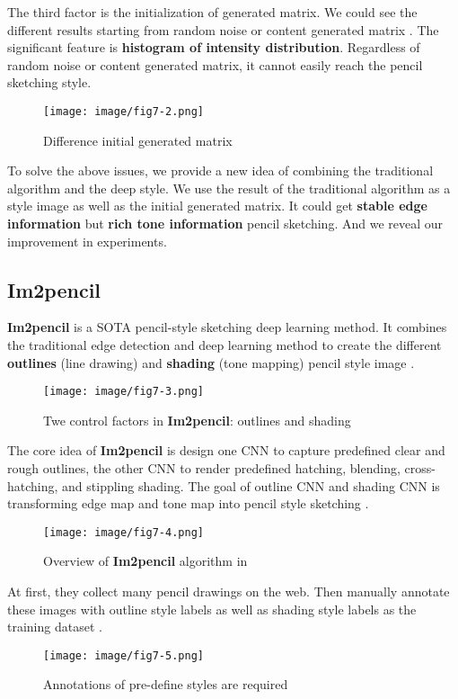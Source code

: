 The third factor is the initialization of generated matrix. We could see the different results starting from random noise or content generated matrix . The significant feature is \textbf{histogram of intensity distribution}. Regardless of random noise or content generated matrix, it cannot easily reach the pencil sketching style.
\begin{figure}
  \centering
  \texttt{[image: image/fig7-2.png]}
  \caption{Difference initial generated matrix}
  \label{fig7-2}
\end{figure}

To solve the above issues, we provide a new idea of combining the traditional algorithm and the deep style. We use the result of the traditional algorithm as a style image as well as the initial generated matrix. It could get \textbf{stable edge information} but \textbf{rich tone information} pencil sketching.
And we reveal our improvement in experiments.

\subsection{Im2pencil}
\textbf{Im2pencil} is a SOTA pencil-style sketching deep learning method. It combines the traditional edge detection and deep learning method to create the different \textbf{outlines} (line drawing) and \textbf{shading} (tone mapping) pencil style image .
\begin{figure}
  \centering
  \texttt{[image: image/fig7-3.png]}
  \caption{Twe control factors in \textbf{Im2pencil}: outlines and shading}
  \label{fig7-3}
\end{figure}

The core idea of \textbf{Im2pencil} is design one CNN to capture predefined clear and rough outlines, the other CNN to render predefined hatching, blending, cross-hatching, and stippling shading.
The goal of outline CNN and shading CNN is transforming edge map and tone map into pencil style sketching .
\begin{figure}
  \centering
  \texttt{[image: image/fig7-4.png]}
  \caption{Overview of \textbf{Im2pencil} algorithm in \cite{2012_Lu_combine}}
  \label{fig7-4}
\end{figure}
At first, they collect many pencil drawings on the web. Then manually annotate these images with outline style labels as well as shading style labels as the training dataset .
\begin{figure}
  \centering
  \texttt{[image: image/fig7-5.png]}
  \caption{Annotations of pre-define styles are required}
  \label{fig7-5}
\end{figure}

